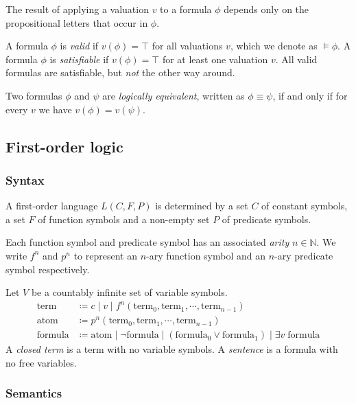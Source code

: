 The result of applying a valuation \(v\) to a formula \(\phi\) depends only on the propositional letters that occur in \(\phi\). 

A formula \(\phi\) is \emph{valid} if \(v(\phi) = \top\) for all valuations \(v\), which we denote as \(\models \phi\). A formula \(\phi\) is \emph{satisfiable} if \(v(\phi) = \top\) for at least one valuation \(v\). All valid formulas are satisfiable, but \emph{not} the other way around.

Two formulas \(\phi\) and \(\psi\) are \emph{logically equivalent}, written as \(\phi \equiv \psi\), if and only if for every \(v\) we have \(v(\phi) = v(\psi)\).



\subsection{First-order logic}

\subsubsection{Syntax}

A first-order language \(L(C, F, P)\) is determined by a set \(C\) of constant symbols, a set \(F\) of function symbols and a non-empty set \(P\) of predicate symbols.
    
Each function symbol and predicate symbol has an associated \emph{arity} \(n \in \mathbb{N}\). We write \(f^n\) and \(p^n\) to represent an \(n\)-ary function symbol and an \(n\)-ary predicate symbol respectively.

Let \(V\) be a countably infinite set of variable symbols.
%
\begin{align*}
    \text{term} &\coloneq c \;\vert\; v \;\vert\; f^n (\text{term}_0, \text{term}_1, \cdots, \text{term}_{n-1}) \tag{where \(c \in C\), \(v \in V\) and \(f^n \in F\)}\\
    \text{atom} &\coloneq p^n (\text{term}_0, \text{term}_1, \cdots, \text{term}_{n-1}) \tag{where \(p^n \in P\)}\\
    \text{formula} &\coloneq \text{atom} \;\vert\; \neg \text{formula} \;\vert\; (\text{formula}_0 \lor \text{formula}_1) \;\vert\; \exists v\; \text{formula}  \tag{where \(v \in V\)}
\end{align*}
%
A \emph{closed term} is a term with no variable symbols. A \emph{sentence} is a formula with no free variables.



\subsubsection{Semantics}

